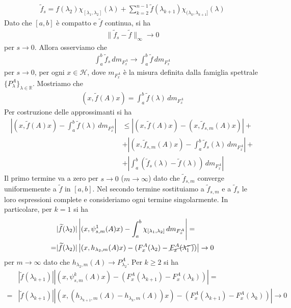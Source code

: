 \documentclass{article}
\numberwithin{equation}{subsection}
\begin{document}
\begin{align*}
    \widetilde{f}_s = f(\lambda_2)\chi_{[\lambda_1, \lambda_2]}(\lambda) + \sum_{k = 2}^{n - 1}\widetilde{f}(\lambda_{k + 1})\chi_{(\lambda_k, \lambda_{k + 1}]}(\lambda)
\end{align*}
Dato che $[a, b]$ è compatto e $\widetilde{f}$ continua, si ha 
\begin{align*}
    \|\widetilde{f}_s - \widetilde{f}\|_\infty \rightarrow 0
\end{align*}
per $s \rightarrow 0$. Allora osserviamo che 
\begin{align*}
    \int_a^b \widetilde{f}_s \, dm_{F^A_x} \rightarrow \int_a^b \widetilde{f} \, dm_{F^A_x}
\end{align*}
per $s \rightarrow 0$, per ogni $x \in \mathcal{H}$, dove $m_{F^A_x}$ è la misura definita dalla famiglia spettrale $\{P^A_\lambda\}_{\lambda \in \mathbb{R}}$. Mostriamo che 
\begin{align*}
    (x, \widetilde{f}(A)x) = \int_a^b \widetilde{f}(\lambda) \, dm_{F^A_x}
\end{align*}
Per costruzione delle approssimanti si ha 
\begin{align*}
    \left|(x, \widetilde{f}(A)x) - \int_a^b \widetilde{f}(\lambda) \, dm_{F^A_x}\right| &\leq |(x, \widetilde{f}(A)x) - (x, \widetilde{f}_{s, m}(A)x)| + \\
    &+ \left|(x, \widetilde{f}_{s, m}(A)x) - \int_a^b \widetilde{f}_s(\lambda) \, dm_{F^A_x}\right| + \\
    &+ \left|\int_a^b (\widetilde{f}_s(\lambda) - \widetilde{f}(\lambda)) \, dm_{F^A_x}\right| 
\end{align*}
Il primo termine va a zero per $s \rightarrow 0$ ($m \rightarrow \infty$) dato che $\widetilde{f}_{s, m}$ converge uniformemente a $\widetilde{f}$ in $[a, b]$. Nel secondo termine sostituiamo a $\widetilde{f}_{s, m}$ e a $\widetilde{f}_s$ le loro espressioni complete e consideriamo ogni termine singolarmente. In particolare, per $k = 1$ si ha
\begin{align*}
    &|\widetilde{f}(\lambda_2)|\left|(x, \psi^1_{s, m}(A)x) - \int_a^b \chi_{[\lambda_1, \lambda_2]} \, dm_{F^A_x}\right| = \\
    =&|\widetilde{f}(\lambda_2)|\left|(x, h_{\lambda_2, m}(A)x) - (F^A_x(\lambda_2) - \cancel{F^A_x(\lambda^-_1)})\right| \rightarrow 0
\end{align*}
per $m \rightarrow \infty$ dato che $h_{\lambda_2, m}(A) \rightarrow P^A_{\lambda_2}$. Per $k \geq 2$ si ha 
\begin{align*}
    &|\widetilde{f}(\lambda_{k + 1})|\left|(x, \psi^k_{s, m}(A)x) - (F^A_x(\lambda_{k + 1}) - F^A_x(\lambda_k))\right| = \\
    =&|\widetilde{f}(\lambda_{k + 1})|\left|(x, (h_{\lambda_{k + 1}, m}(A) - h_{\lambda_k, m}(A))x) - (F^A_x(\lambda_{k + 1}) - F^A_x(\lambda_k))\right| \rightarrow 0
\end{align*}
\end{document}
